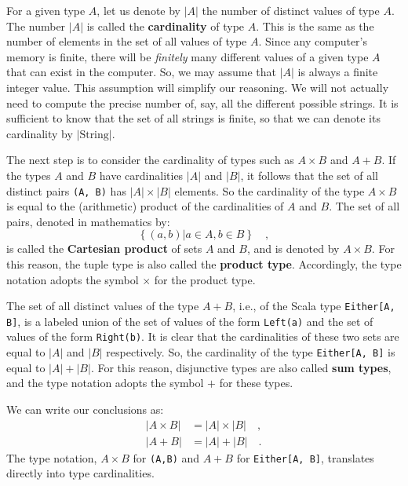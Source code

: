 For a given type $A$, let us denote by $\left|A\right|$ the number
of distinct values of type $A$. The number $\left|A\right|$ is called
the \textbf{cardinality} of type $A$. This is
the same as the number of elements in the set of all values of type
$A$. Since any computer\textsf{'}s memory is finite, there will be \emph{finitely}
many different values of a given type $A$ that can exist in the computer.
So, we may assume that $\left|A\right|$ is always a finite integer
value. This assumption will simplify our reasoning. We will not actually
need to compute the precise number of, say, all the different possible
strings. It is sufficient to know that the set of all strings is finite,
so that we can denote its cardinality by $|\text{String}|$.

The next step is to consider the cardinality of types such as $A\times B$
and $A+B$. If the types $A$ and $B$ have cardinalities $\left|A\right|$
and $\left|B\right|$, it follows that the set of all distinct pairs
\lstinline!(A, B)! has $\left|A\right|\times\left|B\right|$ elements.
So the cardinality of the type $A\times B$ is equal to the (arithmetic)
product of the cardinalities of $A$ and $B$. The set of all pairs,
denoted in mathematics by:
\[
\left\{ (a,b)|a\in A,b\in B\right\} \quad,
\]
is called the \textbf{Cartesian product}
of sets $A$ and $B$, and is denoted by $A\times B$. For this reason,
the tuple type is also called the \textbf{product
type}. Accordingly, the type notation adopts the symbol $\times$
for the product type.

The set of all distinct values of the type $A+B$, i.e., of the Scala
type \lstinline!Either[A, B]!, is a labeled
union of the set of values of the form \lstinline!Left(a)! and the
set of values of the form \lstinline!Right(b)!. It is clear that
the cardinalities of these two sets are equal to $\left|A\right|$
and $\left|B\right|$ respectively. So, the cardinality of the type
\lstinline!Either[A, B]! is equal to $\left|A\right|+\left|B\right|$.
For this reason, disjunctive types are also called \textbf{sum
types}, and the type notation adopts the symbol $+$ for these types.

We can write our conclusions as:
\begin{align*}
\left|A\times B\right| & =\left|A\right|\times\left|B\right|\quad,\\
\left|A+B\right| & =\left|A\right|+\left|B\right|\quad.
\end{align*}
The type notation, $A\times B$ for \lstinline!(A,B)! and $A+B$
for \lstinline!Either[A, B]!, translates directly into type cardinalities.

